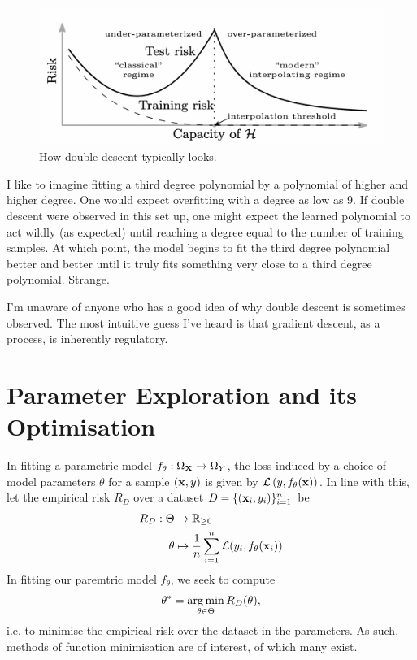 \documentclass[11pt]{article}
\begin{document}
\begin{figure}[t]
    \centering
    \includegraphics[width=\columnwidth]{./figures/supervised_learning/double_descent.png}
    \caption{How double descent typically looks. }
    \label{fig:double_descent}
\end{figure}

I like to imagine fitting a third degree polynomial by a polynomial of higher and higher degree. One would expect overfitting with a degree as low as 9. If double descent were observed in this set up, one might expect the learned polynomial to act wildly (as expected) until reaching a degree equal to the number of training samples. At which point, the model begins to fit the third degree polynomial better and better until it truly fits something very close to a third degree polynomial. Strange.

I'm unaware of anyone who has a good idea of why double descent is sometimes observed. The most intuitive guess I've heard is that gradient descent, as a process, is inherently regulatory.

\section{Parameter Exploration and its Optimisation}
In fitting a parametric model $f_{\theta}:\Omega_{\mathbf{X}}\to\Omega_{Y}$, the loss induced by a choice of model parameters $\theta$ for a sample $(\mathbf{x},y)$ is given by $\mathcal{L}\left(y,f_{\theta}(\mathbf{x})\right)$. In line with this, let the empirical risk $R_D$ over a dataset $D=\{(\mathbf{x}_i,y_i)\}_{i=1}^n$ be
\begin{align*}
    R_D:\Theta&\to\mathbb{R}_{\geq0}\\
    \theta&\mapsto\frac{1}{n}\sum_{i=1}^n\mathcal{L}(y_i,f_{\theta}(\mathbf{x}_i))
\end{align*}
In fitting our paremtric model $f_{\theta}$, we seek to compute
$$
\theta^{*}
=
\operatorname*{arg\,min}_{\theta\in\Theta}R_D(\theta),
$$
i.e. to minimise the empirical risk over the dataset in the parameters. As such, methods of function minimisation are of interest, of which many exist.
\end{document}
